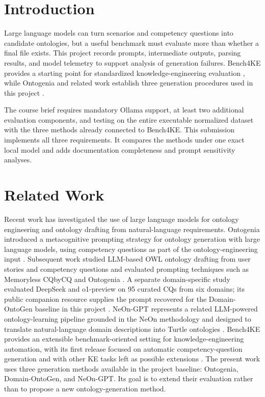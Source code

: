 \documentclass[11pt,a4paper]{article}
\begin{document}
\section{Introduction}

Large language models can turn scenarios and competency questions into candidate
ontologies, but a useful benchmark must evaluate more than whether a final file
exists. This project records prompts, intermediate outputs, parsing results, and
model telemetry to support analysis of generation failures. Bench4KE provides a starting point for
standardized knowledge-engineering evaluation \cite{ciancarini2026bench4ke},
while Ontogenia and related work establish three generation procedures used in
this project \cite{lippolis2024ontogenia,lippolis2025ontology}.

The course brief requires mandatory Ollama support, at least two additional
evaluation components, and testing on the entire executable normalized dataset
with the three methods already connected to Bench4KE. This submission implements
all three requirements.
It compares the methods under one exact local model and adds documentation
completeness and prompt sensitivity analyses.

\section{Related Work}

Recent work has investigated the use of large language models for ontology
engineering and ontology drafting from natural-language requirements.
Ontogenia introduced a metacognitive prompting strategy for ontology generation
with large language models, using competency questions as part of the
ontology-engineering input \cite{lippolis2024ontogenia}. Subsequent work
studied LLM-based OWL ontology drafting from user stories and competency
questions and evaluated prompting techniques such as Memoryless CQbyCQ and
Ontogenia \cite{lippolis2025ontology}. A separate domain-specific study
evaluated DeepSeek and o1-preview on 95 curated CQs from six domains; its
public companion resource supplies the prompt recovered for the
Domain-OntoGen baseline in this project
\cite{lippolis2025domainspecific}. NeOn-GPT represents a related
LLM-powered ontology-learning pipeline grounded in the NeOn methodology and
designed to translate natural-language domain descriptions into Turtle
ontologies \cite{fathallah2024neongpt}. Bench4KE provides an extensible
benchmark-oriented setting for knowledge-engineering automation, with its first
release focused on automatic competency-question generation and with other KE
tasks left as possible extensions \cite{ciancarini2026bench4ke}. The present
work uses three generation methods available in the project baseline:
Ontogenia, Domain-OntoGen, and NeOn-GPT. Its goal is to extend their evaluation
rather than to propose a new ontology-generation method.
\end{document}
